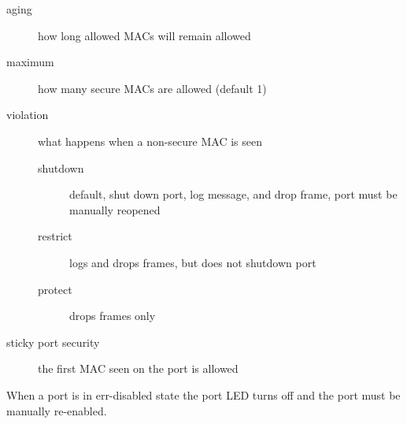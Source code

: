 \begin{description}

\item[aging]
how long allowed MACs will remain allowed

\item[maximum]
how many secure MACs are allowed (default 1)

\item[violation]
what happens when a non-secure MAC is seen

\begin{description}

\item[shutdown]
default, shut down port, log message, and drop frame, port must be manually
reopened

\item[restrict]
logs and drops frames, but does not shutdown port

\item[protect]
drops frames only

\end{description}

\end{description}

\begin{description}

\item[sticky port security]
the first MAC seen on the port is allowed

\end{description}

When a port is in err-disabled state the port LED turns off and the port
must be manually re-enabled.
